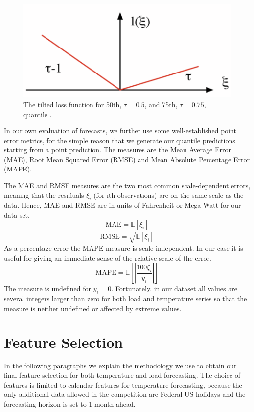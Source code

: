 \documentclass[conference]{IEEEtran}
\begin{document}
\begin{figure}[ht!]
\centering
\includegraphics[width=\linewidth]{gfx/pinball.pdf}
\caption{The tilted loss function for 50th, $\tau=0.5$, and 75th, $\tau=0.75$, quantile \cite{Takeuchi2005}.}
\label{fig:pinball}
\end{figure}
In our own evaluation of forecasts, we further use some well-established point error metrics, for the simple reason that we generate our quantile predictions starting from a point prediction. The measures are the Mean Average Error (MAE), Root Mean Squared Error (RMSE) and Mean Absolute Percentage Error (MAPE).\par
The MAE and RMSE measures are the two most common scale-dependent errors, meaning that the residuals $\xi_i$ (for ith observations) are on the same scale as the data. Hence, MAE and RMSE are in units of Fahrenheit or Mega Watt for our data set. 
\[
  \text{MAE}=\mathbb{E}[\xi_i]
\]
\[
  \text{RMSE}=\sqrt{\mathbb{E}[\xi_i]}
\]
As a percentage error the MAPE measure is scale-independent. In our case it is useful for giving an immediate sense of the relative scale of the error.
\[
  \text{MAPE}=\mathbb{E}\left[\left| \frac{100\xi_i}{y_i} \right|\right]
\]
The measure is undefined for $y_i=0$. Fortunately, in our dataset all values are several integers larger than zero for both load and temperature series so that the measure is neither undefined or affected by extreme values.


\section{Feature Selection}
In the following paragraphs we explain the methodology we use to obtain our final feature selection for both temperature and load forecasting. The choice of features is limited to calendar features for temperature forecasting, because the only additional data allowed in the competition are Federal US holidays and the forecasting horizon is set to 1 month ahead.
\end{document}
